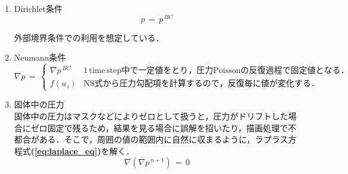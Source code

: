 \begin{enumerate}
\item Dirichlet条件
\begin{equation}
p \,=\, p^{\,BC}
\label{eq:dirichlet bc in poisson}
\end{equation}

外部境界条件での利用を想定している．\\

\item Neumann条件
\begin{equation}
\nabla p \,=\, \left \{
\begin{array}{ll}
\nabla p^{\,BC} & 1\, \mathrm{time\, step}中で一定値をとり，圧力\mathrm{Poisson}の反復過程で固定値となる．\\
f(u_{\,i}) & \mathrm{NS}式から圧力勾配項を計算するので，反復毎に値が変化する．
\end{array} \right .
\label{eq:neumann bc in poisson}
\end{equation}

\item 固体中の圧力\\
固体中の圧力はマスクなどによりゼロとして扱うと，圧力がドリフトした場合にゼロ固定で残るため，結果を見る場合に誤解を招いたり，描画処理で不都合がある．そこで，周囲の値の範囲内に自然に収まるように，ラプラス方程式\textbf{(\ref{eq:laplace_eq})}を解く．
\begin{equation}
\nabla \left( \nabla p^{\,n+1} \right) \,=\, 0
\label{eq:laplace_eq}
\end{equation}
\end{enumerate}

\vspace{5mm}

